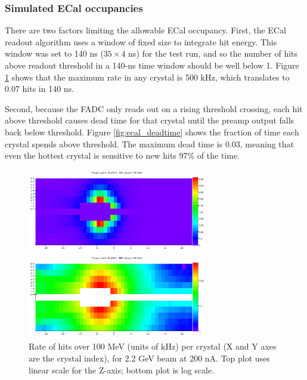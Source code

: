 \clearpage

\subsubsection{Simulated ECal occupancies}

There are two factors limiting the allowable ECal occupancy. First, the ECal 
readout algorithm uses a window of fixed size to integrate hit energy. This 
window was set to 140 ns ($35 \times 4$ ns) for the test run, and so the 
number of hits above readout threshold in a 140-ns time window should be well 
below 1. Figure \ref{fig:ecal_rate} shows that the maximum rate in any crystal 
is 500 kHz, which translates to 0.07 hits in 140 ns.

Second, because the FADC only reads out on a rising threshold crossing, each 
hit above threshold causes dead time for that crystal until the preamp output 
falls back below threshold. Figure \ref{fig:ecal_deadtime} shows the fraction 
of time each crystal spends above threshold. The maximum dead time is 0.03, 
meaning that even the hottest crystal is sensitive to new hits 97\% of the time.

\begin{figure}[ht]
	\includegraphics[width=0.7\textwidth]{performance/ecal_rate_100mev_22}

	\includegraphics[width=0.7\textwidth]{performance/ecal_rate_100mev_22_log}
	\caption{\small{Rate of hits over 100 MeV (units of kHz) per crystal (X and Y axes are the crystal index), 
for 2.2 GeV beam at 200 nA. Top plot uses linear scale for the Z-axis; bottom plot is log scale.}}
	\label{fig:ecal_rate}
\end{figure}

